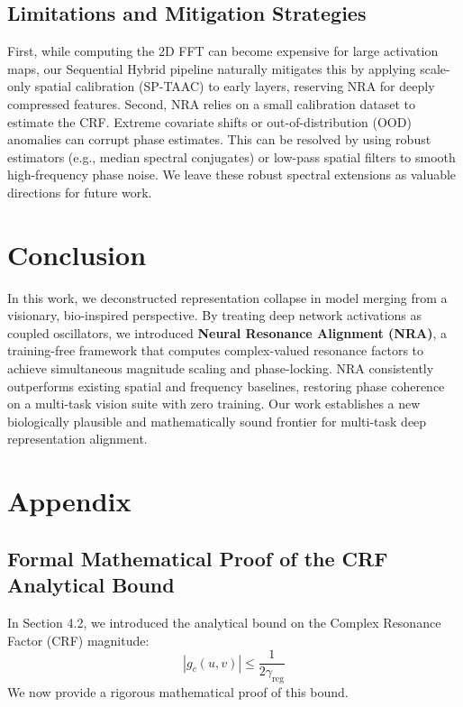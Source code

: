 \documentclass{article}
\theoremstyle{plain}
\theoremstyle{definition}
\theoremstyle{remark}
\begin{document}
\subsection{Limitations and Mitigation Strategies}
First, while computing the 2D FFT can become expensive for large activation maps, our Sequential Hybrid pipeline naturally mitigates this by applying scale-only spatial calibration (SP-TAAC) to early layers, reserving NRA for deeply compressed features. Second, NRA relies on a small calibration dataset to estimate the CRF. Extreme covariate shifts or out-of-distribution (OOD) anomalies can corrupt phase estimates. This can be resolved by using robust estimators (e.g., median spectral conjugates) or low-pass spatial filters to smooth high-frequency phase noise. We leave these robust spectral extensions as valuable directions for future work.

\section{Conclusion}
\label{submission-conclusion}
In this work, we deconstructed representation collapse in model merging from a visionary, bio-inspired perspective. By treating deep network activations as coupled oscillators, we introduced \textbf{Neural Resonance Alignment (NRA)}, a training-free framework that computes complex-valued resonance factors to achieve simultaneous magnitude scaling and phase-locking. NRA consistently outperforms existing spatial and frequency baselines, restoring phase coherence on a multi-task vision suite with zero training. Our work establishes a new biologically plausible and mathematically sound frontier for multi-task deep representation alignment.




\clearpage
\appendix
\section{Appendix}
\label{submission-appendix}

\subsection{Formal Mathematical Proof of the CRF Analytical Bound}
\label{appendix-proof}
In Section 4.2, we introduced the analytical bound on the Complex Resonance Factor (CRF) magnitude:
\begin{equation}
    |g_c(u, v)| \leq \frac{1}{2 \gamma_{\text{reg}}}
\end{equation}
We now provide a rigorous mathematical proof of this bound.
\end{document}
